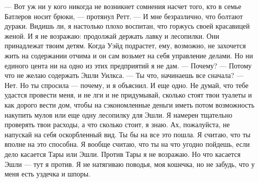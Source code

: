 — Вот уж ни у кого никогда не возникнет сомнения насчет того, кто в семье Батлеров носит брюки, — протянул Ретт. — И мне безразлично, что болтают дураки. Видишь ли, я настолько плохо воспитан, что горжусь своей красавицей женой. И я не возражаю: продолжай держать лавку и лесопилки. Они принадлежат твоим детям. Когда Уэйд подрастет, ему, возможно, не захочется жить на содержании отчима и он сам возьмет на себя управление делами. Но ни единого цента ни на одно из этих предприятий я не дам.
— Почему?
— Потому что не желаю содержать Эшли Уилкса.
— Ты что, начинаешь все сначала?
— Нет. Но ты спросила — почему, и я объяснил. И еще одно. Не думай, что тебе удастся провести меня, и не лги и не придумывай, сколько стоят твои туалеты и как дорого вести дом, чтобы на сэкономленные деньги иметь потом возможность накупить мулов или еще одну лесопилку для Эшли. Я намерен тщательно проверять твои расходы, а что сколько стоит, я знаю. Ах, пожалуйста, не напускай на себя оскорбленный вид. Ты бы на все это пошла. Я считаю, что ты вполне на это способна. Я вообще считаю, что ты на что угодно пойдешь, если дело касается Тары или Эшли. Против Тары я не возражаю. Но что касается Эшли — тут я против. Я не натягиваю поводья, моя кошечка, но не забудь, что у меня есть уздечка и шпоры.

